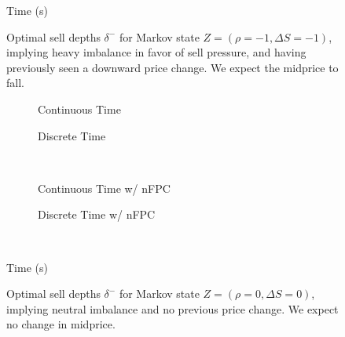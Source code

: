 \begin{figure}
Time (s)

\vspace{1cm}
\begin{subfigure}{\linewidth}
  \centering
   
\end{subfigure}%
  \caption{Optimal sell depths $\delta^{-}$ for Markov state $Z=(\rho = -1, \Delta S = -1)$, implying heavy imbalance in favor of sell pressure, and having previously seen a downward price change. We expect the midprice to fall.}
  \label{fig:comp_dm_z1}
\end{figure}

\begin{figure}
\centering
\begin{subfigure}{.45\linewidth}
  \centering
  \setlength\figureheight{\linewidth} 
  \setlength\figurewidth{\linewidth}
  
  \caption{Continuous Time}
\end{subfigure}%
\hfill%
\begin{subfigure}{.45\linewidth}
  \centering
  \setlength\figureheight{\linewidth} 
  \setlength\figurewidth{\linewidth}
   
  \caption{Discrete Time}
\end{subfigure}\\
\vspace{1cm}
\begin{subfigure}{.45\linewidth}
  \centering
  \setlength\figureheight{\linewidth} 
  \setlength\figurewidth{\linewidth}
   
  \caption{Continuous Time w/ nFPC}
\end{subfigure}%
\hfill%
\begin{subfigure}{.45\linewidth}
  \centering
  \setlength\figureheight{\linewidth} 
  \setlength\figurewidth{\linewidth}
   
  \caption{Discrete Time w/ nFPC}
\end{subfigure}\\

\leavevmode{}\hspace{0pt plus 1filll}\null

Time (s)

\vspace{1cm}
\begin{subfigure}{\linewidth}
  \centering
   
\end{subfigure}%
  \caption{Optimal sell depths $\delta^-$ for Markov state $Z=(\rho = 0, \Delta S = 0)$, implying neutral imbalance and no previous price change. We expect no change in midprice.}
  \label{fig:comp_dm_z8}
\end{figure}

